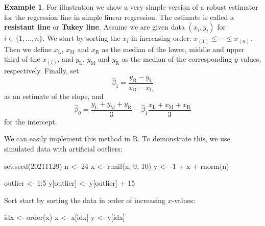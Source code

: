 \documentclass[
  a4paper,
]{article}
\newenvironment{Shaded}{\begin{snugshade}}{\end{snugshade}}
\newcommand{\DecValTok}[1]{\textcolor[rgb]{0.00,0.00,0.81}{#1}}
\newcommand{\FunctionTok}[1]{\textcolor[rgb]{0.00,0.00,0.00}{#1}}
\newcommand{\NormalTok}[1]{#1}
\newcommand{\OtherTok}[1]{\textcolor[rgb]{0.56,0.35,0.01}{#1}}
\newcommand{\SpecialCharTok}[1]{\textcolor[rgb]{0.00,0.00,0.00}{#1}}
\theoremstyle{definition}
\theoremstyle{definition}
\newtheorem{example}{Example}[section]
\theoremstyle{definition}
\theoremstyle{definition}
\theoremstyle{remark}
\begin{document}
\begin{example}
\protect\hypertarget{exm:resistant-line}{}\label{exm:resistant-line}For illustration we show a very simple version of a robust estimator
for the regression line in simple linear regression. The estimate
is called a \textbf{resistant line} or \textbf{Tukey line}. Assume we are
given data \((x_i, y_i)\) for \(i \in \{1, \ldots, n\}\). We start by sorting
the \(x_i\) in increasing order: \(x_{(1)} \leq \cdots \leq x_{(n)}\).
Then we define \(x_\mathrm{L}\), \(x_\mathrm{M}\) and \(x_\mathrm{R}\)
as the median of the lower, middle and upper third of the \(x_{(i)}\),
and \(y_\mathrm{L}\), \(y_\mathrm{M}\) and \(y_\mathrm{R}\) as the median
of the corresponding \(y\) values, respectively. Finally, set
\begin{equation*}
  \hat\beta_1
  = \frac{y_\mathrm{R} - y_\mathrm{L}}{x_\mathrm{R} - x_\mathrm{L}}
\end{equation*}
as an estimate of the slope, and
\begin{equation*}
  \hat\beta_0
  = \frac{y_\mathrm{L} + y_\mathrm{M} + y_\mathrm{R}}{3}
      - \hat\beta_1 \frac{x_\mathrm{L} + x_\mathrm{M} + x_\mathrm{R}}{3}
\end{equation*}
for the intercept.

We can easily implement this method in R. To demonstrate this,
we use simulated data with artificial outliers:

\begin{Shaded}
\begin{Highlighting}[]
\FunctionTok{set.seed}\NormalTok{(}\DecValTok{20211129}\NormalTok{)}
\NormalTok{n }\OtherTok{\textless{}{-}} \DecValTok{24}
\NormalTok{x }\OtherTok{\textless{}{-}} \FunctionTok{runif}\NormalTok{(n, }\DecValTok{0}\NormalTok{, }\DecValTok{10}\NormalTok{)}
\NormalTok{y }\OtherTok{\textless{}{-}} \SpecialCharTok{{-}}\DecValTok{1} \SpecialCharTok{+}\NormalTok{ x }\SpecialCharTok{+} \FunctionTok{rnorm}\NormalTok{(n)}

\NormalTok{outlier }\OtherTok{\textless{}{-}} \DecValTok{1}\SpecialCharTok{:}\DecValTok{5}
\NormalTok{y[outlier] }\OtherTok{\textless{}{-}}\NormalTok{ y[outlier] }\SpecialCharTok{+} \DecValTok{15}
\end{Highlighting}
\end{Shaded}

Sort start by sorting the data in order of increasing \(x\)-values:

\begin{Shaded}
\begin{Highlighting}[]
\NormalTok{idx }\OtherTok{\textless{}{-}} \FunctionTok{order}\NormalTok{(x)}
\NormalTok{x }\OtherTok{\textless{}{-}}\NormalTok{ x[idx]}
\NormalTok{y }\OtherTok{\textless{}{-}}\NormalTok{ y[idx]}
\end{Highlighting}
\end{Shaded}


\end{example}
\end{document}
